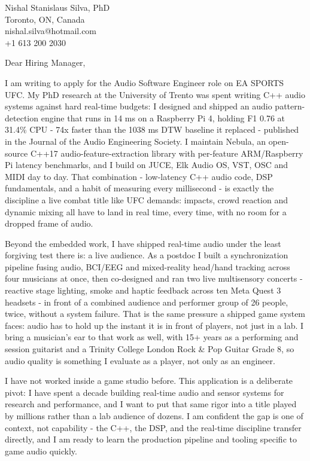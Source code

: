 \documentclass[11pt]{article}
\begin{document}
\pagestyle{empty}

\begin{flushright}
Nishal Stanislaus Silva, PhD \\
Toronto, ON, Canada \\
nishal.silva@hotmail.com \\
+1 613 200 2030
\end{flushright}

\noindent Dear Hiring Manager,

\vspace{0.5em}
\noindent I am writing to apply for the Audio Software Engineer role on EA SPORTS UFC. My PhD research at the University of Trento was spent writing C++ audio systems against hard real-time budgets: I designed and shipped an audio pattern-detection engine that runs in 14 ms on a Raspberry Pi 4, holding F1 0.76 at 31.4\% CPU - 74x faster than the 1038 ms DTW baseline it replaced - published in the Journal of the Audio Engineering Society. I maintain Nebula, an open-source C++17 audio-feature-extraction library with per-feature ARM/Raspberry Pi latency benchmarks, and I build on JUCE, Elk Audio OS, VST, OSC and MIDI day to day. That combination - low-latency C++ audio code, DSP fundamentals, and a habit of measuring every millisecond - is exactly the discipline a live combat title like UFC demands: impacts, crowd reaction and dynamic mixing all have to land in real time, every time, with no room for a dropped frame of audio.

\vspace{0.5em}
\noindent Beyond the embedded work, I have shipped real-time audio under the least forgiving test there is: a live audience. As a postdoc I built a synchronization pipeline fusing audio, BCI/EEG and mixed-reality head/hand tracking across four musicians at once, then co-designed and ran two live multisensory concerts - reactive stage lighting, smoke and haptic feedback across ten Meta Quest 3 headsets - in front of a combined audience and performer group of 26 people, twice, without a system failure. That is the same pressure a shipped game system faces: audio has to hold up the instant it is in front of players, not just in a lab. I bring a musician's ear to that work as well, with 15+ years as a performing and session guitarist and a Trinity College London Rock \& Pop Guitar Grade 8, so audio quality is something I evaluate as a player, not only as an engineer.

\vspace{0.5em}
\noindent I have not worked inside a game studio before. This application is a deliberate pivot: I have spent a decade building real-time audio and sensor systems for research and performance, and I want to put that same rigor into a title played by millions rather than a lab audience of dozens. I am confident the gap is one of context, not capability - the C++, the DSP, and the real-time discipline transfer directly, and I am ready to learn the production pipeline and tooling specific to game audio quickly.
\end{document}
